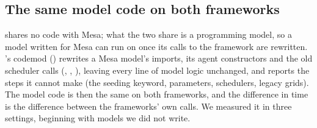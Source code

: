 \subsection{The same model code on both frameworks}
\label{sec:samecode}

\modelly{} shares no code with Mesa; what the two share is a
programming model, so a model written for Mesa can run on \modelly{} once its calls to the
framework are rewritten. \modelly{}'s codemod () rewrites a Mesa
model's imports, its agent constructors and the old scheduler calls (,
, ), leaving every line of model logic unchanged, and
reports the steps it cannot make (the seeding keyword,  parameters, schedulers,
legacy grids). The model code is then the same on both frameworks, and the difference in time
is the difference between the frameworks' own calls. We measured it in three settings,
beginning with models we did not write.

